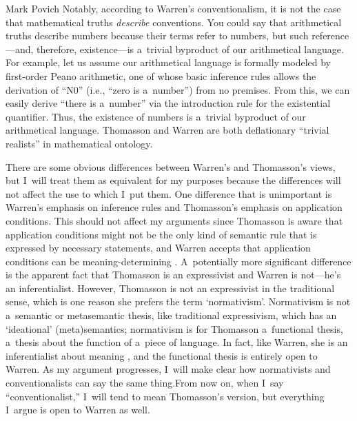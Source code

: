 \begin{artengenv}{Mark Povich}
Notably, according to Warren's
\parencite*[][]{simpson_creeping_2020} %
 conventionalism, it is not the case that mathematical truths \textit{describe} conventions. You could say that arithmetical truths describe numbers because their terms refer to numbers, but such reference---and, therefore, existence---is a~trivial byproduct of our arithmetical language. For example, let us assume our arithmetical language is formally modeled by first-order Peano arithmetic, one of whose basic inference rules allows the derivation of ``N0'' (i.e., ``zero is a~number'') from no premises. From this, we can easily derive ``there is a~number'' via the introduction rule for the existential quantifier. Thus, the existence of numbers is a~trivial byproduct of our arithmetical language. Thomasson and Warren are both deflationary ``trivial realists'' in mathematical ontology.

There are some obvious differences between Warren's and Thomasson's views, but I~will treat them as equivalent for my purposes because the differences will not affect the use to which I~put them. One difference that is unimportant is Warren's emphasis on inference rules and Thomasson's emphasis on application conditions. This should not affect my arguments since Thomasson is aware that application conditions might not be the only kind of semantic rule that is expressed by necessary statements, and Warren accepts that application conditions can be meaning-determining
\parencite[][]{warren_inferentialism_2022}. %
 A~potentially more significant difference is the apparent fact that Thomasson is an expressivist and Warren is not---he's an inferentialist. However, Thomasson is not an expressivist in the traditional sense, which is one reason she prefers the term ‘normativism'. Normativism is not a~semantic or metasemantic thesis, like traditional expressivism, which has an ‘ideational' (meta)semantics; normativism is for Thomasson a~functional thesis, a~thesis about the function of a~piece of language. In fact, like Warren, she is an inferentialist about meaning 
\parencite[][p.79]{thomasson_norms_2020}, %
 and the functional thesis is entirely open to Warren. As my argument progresses, I~will make clear how normativists and conventionalists can say the same thing.From now on, when I~say ``conventionalist,'' I~will tend to mean Thomasson's version, but everything I~argue is open to Warren as well.


\end{artengenv}
